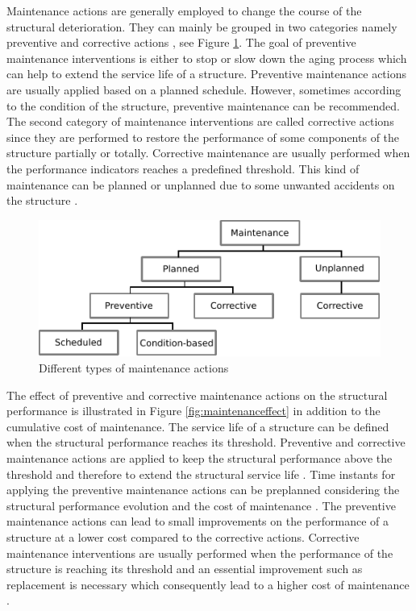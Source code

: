 Maintenance actions are generally employed to change the course of the structural deterioration. They can mainly be grouped in two categories namely preventive and corrective actions
, see Figure \ref{fig:maintenancetypes}. The goal of preventive maintenance interventions is either to stop or slow down the aging process which can help to extend the service life 
of a structure. Preventive maintenance actions are usually applied based on a planned schedule. However, sometimes according to the condition of the structure, preventive maintenance 
can be recommended. The second category of maintenance interventions are called corrective actions since 
they are performed to restore the performance of some components of the structure partially or totally. Corrective maintenance are usually performed when the performance indicators 
reaches a predefined threshold. This kind of maintenance can be planned or unplanned due to some unwanted accidents on the structure \citep{BARONE201421}.

\begin{figure}[hbt!]
\centering
  \includegraphics[width=0.75\linewidth]{figures/fig-ch1/maintenance.pdf}
  \caption{Different types of maintenance actions}
  \label{fig:maintenancetypes}
\end{figure}

The effect of preventive and corrective maintenance actions on the structural performance is illustrated in Figure \ref{fig:maintenanceffect} in addition to the cumulative cost of
maintenance. The service life of a 
structure can be defined when the structural performance reaches its threshold. Preventive and corrective maintenance actions are applied to keep the structural performance above
the threshold and therefore to extend the structural service life \citep{Kong2003a, Kong2003b, Neves2006}. Time instants for applying the preventive maintenance actions can be
preplanned considering the structural performance evolution and the cost 
of maintenance \citep{Nader2010}. The preventive maintenance actions can lead to small improvements on the performance of a structure at a lower cost compared to the corrective actions.  
Corrective maintenance interventions are usually performed when the performance of the structure is reaching its threshold and an essential improvement such as replacement is necessary
which consequently lead to a higher cost of maintenance \citep{Farngbook2019}. 

